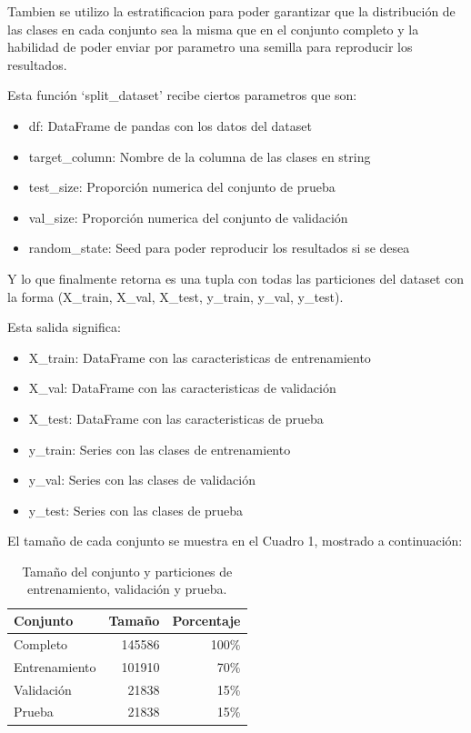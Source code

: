 \documentclass[12pt,a4paper]{article}
\begin{document}
Tambien se utilizo la estratificacion para poder garantizar que la distribución de las clases
en cada conjunto sea la misma que en el conjunto completo y la habilidad de poder
enviar por parametro una semilla para reproducir los resultados.

Esta función `split_dataset' recibe ciertos parametros que son:
\begin{itemize}
  \item df: DataFrame de pandas con los datos del dataset
  \item target_column: Nombre de la columna de las clases en string
  \item test_size: Proporción numerica del conjunto de prueba
  \item val_size: Proporción numerica del conjunto de validación
  \item random_state: Seed para poder reproducir los resultados si se desea
\end{itemize}

Y lo que finalmente retorna es una tupla con todas las particiones del dataset con la
forma (X_train, X_val, X_test, y_train, y_val, y_test).

Esta salida significa:

\begin{itemize}
  \item X_train: DataFrame con las caracteristicas de entrenamiento
  \item X_val: DataFrame con las caracteristicas de validación
  \item X_test: DataFrame con las caracteristicas de prueba
  \item y_train: Series con las clases de entrenamiento
  \item y_val: Series con las clases de validación
  \item y_test: Series con las clases de prueba
\end{itemize}

El tamaño de cada conjunto se muestra en el Cuadro 1, mostrado a continuación:

\begin{table}[ht]
  \centering
  \begin{tabular}{lrr}
    \hline
    Conjunto        & Tamaño & Porcentaje \\
    \hline
    Completo        & 145586 & 100\% \\
    Entrenamiento   & 101910 & 70\% \\
    Validación      & 21838  & 15\% \\
    Prueba          & 21838  & 15\% \\
    \hline
  \end{tabular}
  \caption{Tamaño del conjunto y particiones de entrenamiento, validación y prueba.}
  \label{tab:particiones_kdd99}
\end{table}
\end{document}
